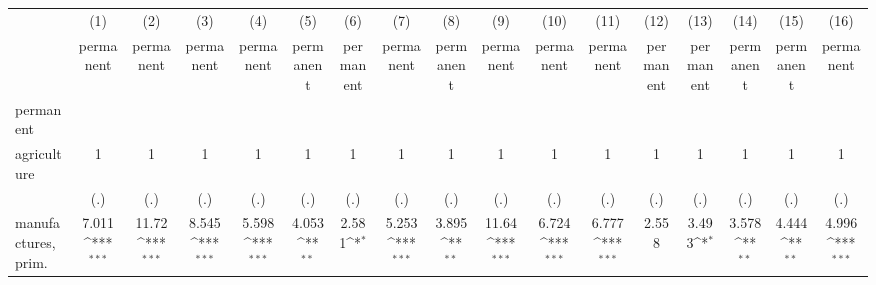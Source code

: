 {
\def\sym#1{\ifmmode^{#1}\else\(^{#1}\)\fi}
\begin{tabular}{l*{16}{c}}
\hline\hline
                    &\multicolumn{1}{c}{(1)}&\multicolumn{1}{c}{(2)}&\multicolumn{1}{c}{(3)}&\multicolumn{1}{c}{(4)}&\multicolumn{1}{c}{(5)}&\multicolumn{1}{c}{(6)}&\multicolumn{1}{c}{(7)}&\multicolumn{1}{c}{(8)}&\multicolumn{1}{c}{(9)}&\multicolumn{1}{c}{(10)}&\multicolumn{1}{c}{(11)}&\multicolumn{1}{c}{(12)}&\multicolumn{1}{c}{(13)}&\multicolumn{1}{c}{(14)}&\multicolumn{1}{c}{(15)}&\multicolumn{1}{c}{(16)}\\
                    &\multicolumn{1}{c}{permanent}&\multicolumn{1}{c}{permanent}&\multicolumn{1}{c}{permanent}&\multicolumn{1}{c}{permanent}&\multicolumn{1}{c}{permanent}&\multicolumn{1}{c}{permanent}&\multicolumn{1}{c}{permanent}&\multicolumn{1}{c}{permanent}&\multicolumn{1}{c}{permanent}&\multicolumn{1}{c}{permanent}&\multicolumn{1}{c}{permanent}&\multicolumn{1}{c}{permanent}&\multicolumn{1}{c}{permanent}&\multicolumn{1}{c}{permanent}&\multicolumn{1}{c}{permanent}&\multicolumn{1}{c}{permanent}\\
\hline
permanent           &                     &                     &                     &                     &                     &                     &                     &                     &                     &                     &                     &                     &                     &                     &                     &                     \\
agriculture         &           1         &           1         &           1         &           1         &           1         &           1         &           1         &           1         &           1         &           1         &           1         &           1         &           1         &           1         &           1         &           1         \\
                    &         (.)         &         (.)         &         (.)         &         (.)         &         (.)         &         (.)         &         (.)         &         (.)         &         (.)         &         (.)         &         (.)         &         (.)         &         (.)         &         (.)         &         (.)         &         (.)         \\
[1em]
manufactures, prim. &       7.011\sym{***}&       11.72\sym{***}&       8.545\sym{***}&       5.598\sym{***}&       4.053\sym{**} &       2.581\sym{*}  &       5.253\sym{***}&       3.895\sym{**} &       11.64\sym{***}&       6.724\sym{***}&       6.777\sym{***}&       2.558         &       3.493\sym{*}  &       3.578\sym{**} &       4.444\sym{**} &       4.996\sym{***}\\

\end{tabular}}
